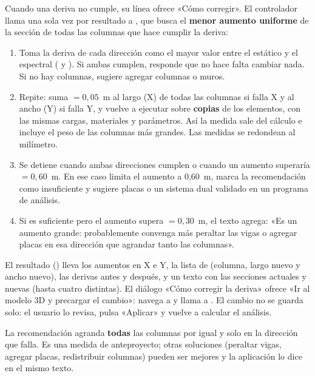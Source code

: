 Cuando una deriva no cumple, su línea ofrece «Cómo corregir». El controlador llama una sola vez por resultado a
, que busca el \textbf{menor aumento uniforme} de
la sección de todas las columnas que hace cumplir la deriva:

\begin{enumerate}
	\item Toma la deriva de cada dirección como el mayor valor entre el estático y el espectral
	      ( y ). Si ambas cumplen, responde que no hace falta
	      cambiar nada. Si no hay columnas, sugiere agregar columnas o muros.
	\item Repite: suma  $= 0{,}05$~m al largo (X) de todas las columnas si falla X y al ancho
	      (Y) si falla Y, y vuelve a ejecutar  sobre \textbf{copias} de los elementos, con las
	      mismas cargas, materiales y parámetros. Así la medida sale del cálculo e incluye el peso de las columnas más
	      grandes. Las medidas se redondean al milímetro.
	\item Se detiene cuando ambas direcciones cumplen o cuando un aumento superaría 
	      $= 0{,}60$~m. En ese caso limita el aumento a 0,60~m, marca la recomendación como insuficiente y sugiere placas o
	      un sistema dual validado en un programa de análisis.
	\item Si es suficiente pero el aumento supera  $= 0{,}30$~m, el texto agrega:
	      «Es un aumento grande: probablemente convenga más peraltar las vigas o agregar placas en esa dirección que
	      agrandar tanto las columnas».
\end{enumerate}

El resultado () lleva los aumentos en X e Y, la lista de  (columna, largo nuevo y ancho
nuevo), las derivas antes y después, y un texto con las secciones actuales y nuevas (hasta cuatro distintas). El diálogo
«Cómo corregir la deriva» ofrece «Ir al modelo 3D y precargar el cambio»: navega a  y llama a
. El cambio no se guarda solo: el usuario lo revisa, pulsa
«Aplicar» y vuelve a calcular el análisis.

\begin{consejo}
La recomendación agranda \textbf{todas} las columnas por igual y solo en la dirección que falla. Es una medida de
anteproyecto; otras soluciones (peraltar vigas, agregar placas, redistribuir columnas) pueden ser mejores y la
aplicación lo dice en el mismo texto.
\end{consejo}


